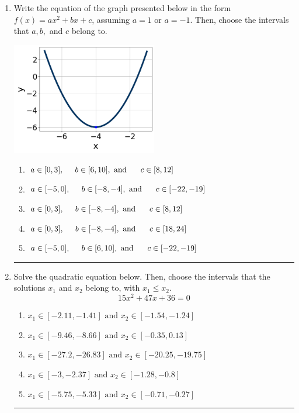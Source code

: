 \documentclass[14pt]{extbook}
\newcommand{\litem}[1]{\item#1\hspace*{-1cm}\rule{\textwidth}{0.4pt}}
\begin{document}
\begin{enumerate}
{\begin{enumerate}[label=\Alph*.]
\end{enumerate} }
\litem{
Write the equation of the graph presented below in the form $f(x)=ax^2+bx+c$, assuming  $a=1$ or $a=-1$. Then, choose the intervals that $a, b,$ and $c$ belong to.
\begin{center}
    \includegraphics[width=0.5\textwidth]{../Figures/quadraticGraphToEquationB.png}
\end{center}
\begin{enumerate}[label=\Alph*.]
\item \( a \in [0, 3], \hspace*{5mm} b \in [6, 10], \text{ and } \hspace*{5mm} c \in [8, 12] \)
\item \( a \in [-5, 0], \hspace*{5mm} b \in [-8, -4], \text{ and } \hspace*{5mm} c \in [-22, -19] \)
\item \( a \in [0, 3], \hspace*{5mm} b \in [-8, -4], \text{ and } \hspace*{5mm} c \in [8, 12] \)
\item \( a \in [0, 3], \hspace*{5mm} b \in [-8, -4], \text{ and } \hspace*{5mm} c \in [18, 24] \)
\item \( a \in [-5, 0], \hspace*{5mm} b \in [6, 10], \text{ and } \hspace*{5mm} c \in [-22, -19] \)

\end{enumerate} }
\litem{
Solve the quadratic equation below. Then, choose the intervals that the solutions $x_1$ and $x_2$ belong to, with $x_1 \leq x_2$.\[ 15x^{2} +47 x + 36 = 0 \]\begin{enumerate}[label=\Alph*.]
\item \( x_1 \in [-2.11, -1.41] \text{ and } x_2 \in [-1.54, -1.24] \)
\item \( x_1 \in [-9.46, -8.66] \text{ and } x_2 \in [-0.35, 0.13] \)
\item \( x_1 \in [-27.2, -26.83] \text{ and } x_2 \in [-20.25, -19.75] \)
\item \( x_1 \in [-3, -2.37] \text{ and } x_2 \in [-1.28, -0.8] \)
\item \( x_1 \in [-5.75, -5.33] \text{ and } x_2 \in [-0.71, -0.27] \)


\end{enumerate}}
\end{enumerate}
\end{document}

